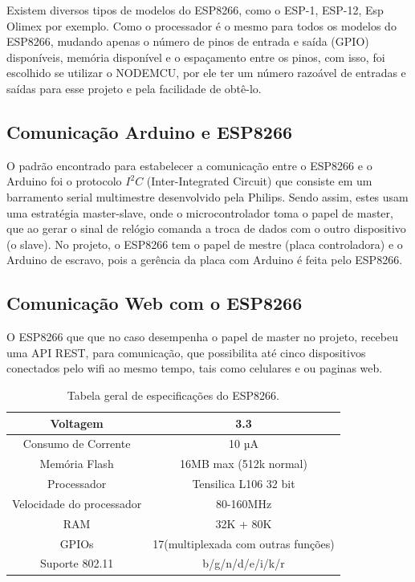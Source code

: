 \documentclass[conference]{IEEEtran}
\begin{document}
Existem diversos tipos de modelos do ESP8266, como o ESP-1, ESP-12, Esp Olimex por exemplo. Como o processador é o mesmo para todos os modelos do ESP8266, mudando apenas o número de pinos de entrada e saída (GPIO) disponíveis, memória disponível e o espaçamento entre os pinos, com isso, foi escolhido se utilizar o NODEMCU, por ele ter um número razoável de entradas e saídas para esse projeto e pela facilidade de obtê-lo.

\subsection{Comunicação Arduino e ESP8266}
O padrão encontrado para estabelecer a comunicação entre o ESP8266 e o Arduino foi o protocolo $I^2C$ (Inter-Integrated Circuit) que consiste em um barramento serial multimestre desenvolvido pela Philips. Sendo assim, estes usam uma estratégia master-slave, onde o microcontrolador toma o papel de master, que ao gerar o sinal de relógio comanda a troca de dados com o outro dispositivo (o slave).
No projeto, o ESP8266 tem o papel de mestre (placa controladora) e o Arduino de escravo, pois a gerência da placa com Arduino é feita pelo ESP8266.

\subsection{Comunicação Web com o ESP8266}
O ESP8266 que que no caso desempenha o papel de master no projeto, recebeu uma API REST, para comunicação, que possibilita até cinco dispositivos conectados pelo wifi ao mesmo tempo, tais como
celulares e ou paginas web.


\begin{table}[htbp]
\caption{Tabela geral de especificações do ESP8266.}
\begin{center}
\begin{tabular}{|c|c|}
\hline
Voltagem & 3.3 \\
\hline
Consumo de Corrente & 10 µA \\
\hline
Memória Flash & 16MB max (512k normal) \\
\hline
Processador & Tensilica L106 32 bit \\
\hline
Velocidade do processador & 80-160MHz \\
\hline
RAM & 32K + 80K \\
\hline
GPIOs & 17(multiplexada com outras funções) \\
\hline
Suporte 802.11 & b/g/n/d/e/i/k/r \\
\hline
\end{tabular}
\label{tab1}
\end{center}
\end{table}
\end{document}
